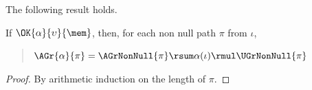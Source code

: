The following result holds. 

\begin{proposition}
If $\OK{\alpha}{\upsilon}{\mem}$, then, for each non null path $\pi$ from $\iota$,
\begin{quote}
$\AGr{\alpha}{\pi}=\AGrNonNull{\pi}\rsum\alpha(\iota)\rmul\UGrNonNull{\pi}$
\end{quote}
\end{proposition}
\begin{proof}
By arithmetic induction on the length of $\pi$. 
\end{proof}







